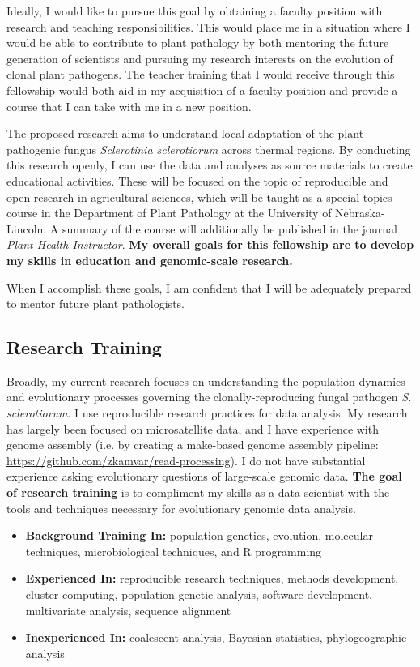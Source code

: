 \documentclass[12pt,letterpaper]{article}
\begin{document}
Ideally, I would like to pursue this goal by obtaining a faculty position with
research and teaching responsibilities. 
This would place me in a situation where I would be able to contribute to plant pathology by both mentoring the future generation of scientists and pursuing my research interests on the evolution of clonal plant pathogens.
The teacher training that I would receive through this fellowship would both aid in my acquisition of a faculty position and provide a course that I can take with me in a new position.

The proposed research aims to understand local adaptation of the plant pathogenic fungus \textit{Sclerotinia sclerotiorum} across thermal regions. 
By conducting this research openly, I can use the data and analyses as source materials to create educational activities. 
These will be focused on the topic of reproducible and open research in agricultural sciences, which will be taught as a special topics course in the Department of Plant Pathology at the University of Nebraska-Lincoln. 
A summary of the course will additionally be published in the journal \textit{Plant Health Instructor}. 
\textbf{My overall goals for this fellowship are to develop my skills in education and genomic-scale research.}

When I accomplish these goals, I am confident that I will be adequately prepared to mentor future plant pathologists.

\subsection{Research Training}

Broadly, my current research focuses on understanding the population dynamics and evolutionary processes governing the clonally-reproducing fungal pathogen \textit{S. sclerotiorum}.
I use reproducible research practices for data analysis. 
My research has largely been focused on microsatellite data, and I have experience with genome assembly (i.e. by creating a make-based genome assembly pipeline: \url{https://github.com/zkamvar/read-processing}).
I do not have substantial experience asking evolutionary questions of large-scale genomic data. 
\textbf{The goal of research training} is to compliment my skills as a data scientist with the tools and techniques necessary for evolutionary genomic data analysis. 

\begin{itemize}
  \item \textbf{Background Training In:} population genetics, evolution, molecular techniques, microbiological techniques, and R programming
  \item \textbf{Experienced In:} reproducible research techniques, methods development, cluster computing, population genetic analysis, software development, multivariate analysis, sequence alignment
  \item \textbf{Inexperienced In:} coalescent analysis, Bayesian statistics, phylogeographic analysis
\end{itemize}
\end{document}
